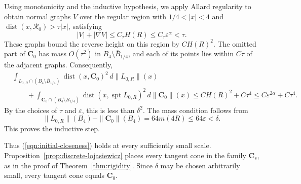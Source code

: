 \documentclass[11pt,a4paper]{article}
\numberwithin{equation}{section}
\theoremstyle{definition}
\theoremstyle{remark}
\newcommand{\dist}{\operatorname{dist}}
\begin{document}
	Using monotonicity and the inductive hypothesis, we apply Allard regularity
	to obtain
	normal graphs $V$ over the regular region with $1/4<|x|<4$ and
	$\dist(x,\mathcal R_0)>\tau|x|$, satisfying
	\[
	|V|+|\nabla V|\le C_\tau H(R)\le C_\tau\varepsilon^\alpha<\tau.
	\]
	These graphs bound the reverse height on this region by $CH(R)^2$.
	The omitted part of $\mathbf C_0$ has mass
	$O(\tau^2)$ in $B_4\setminus\overline B_{1/4}$, and each of its points
	lies within $C\tau$ of the adjacent graphs.
	Consequently,
	\[
	\begin{aligned}
		&\int_{L_{0,R}\cap(B_4\setminus\overline B_{1/4})}
		\dist(x,\mathbf C_0)^2\,d\|L_{0,R}\|(x)\\
		&\qquad+\int_{\mathbf C_0\cap(B_4\setminus\overline B_{1/4})}
		\dist(x,\operatorname{spt}L_{0,R})^2\,d\|\mathbf C_0\|(x)
		\le CH(R)^2+C\tau^4
		\le C\varepsilon^{2\alpha}+C\tau^4.
	\end{aligned}
	\]
	By the choices of $\tau$ and $\varepsilon$, this is less than $\delta^2$.
	The mass condition follows from
	\[
	\|L_{0,R}\|(B_4)-\|\mathbf C_0\|(B_4)
	=64m(4R)\le64\varepsilon<\delta.
	\]
	This proves the inductive step.
	
	Thus (\ref{eqn:initial-closeness}) holds at every sufficiently small
	scale. Proposition~\ref{prop:discrete-lojasiewicz} places every tangent
	cone in the family $\mathbf C_s$, as in the proof of
	Theorem~\ref{thm:rigidity}. Since $\delta$ may be chosen arbitrarily
	small, every tangent cone equals $\mathbf C_0$.

	
\end{document}

